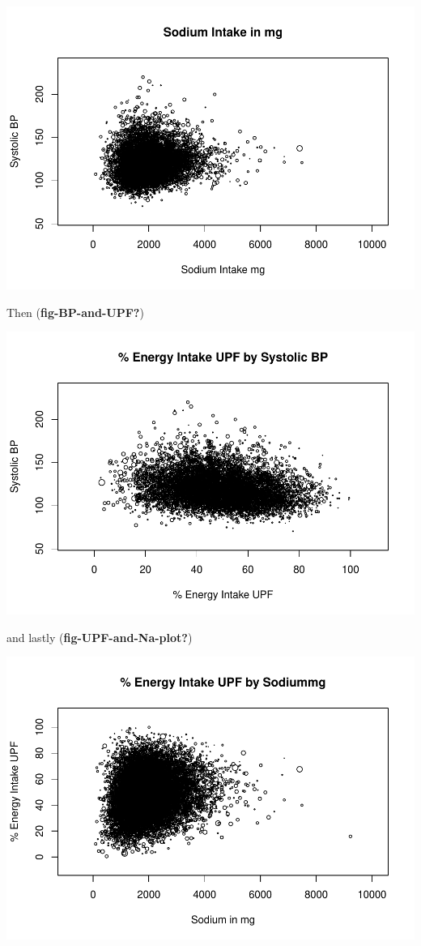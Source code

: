 \documentclass[
]{article}
\begin{document}
\includegraphics{methodandresults_files/figure-latex/fig-Na-by-BP-1.pdf}

Then (\textbf{fig-BP-and-UPF?})

\includegraphics{methodandresults_files/figure-latex/fig-BP-and-UPF-1.pdf}

and lastly (\textbf{fig-UPF-and-Na-plot?})

\includegraphics{methodandresults_files/figure-latex/fig-UPF-and-Na-plot-1.pdf}
\end{document}
